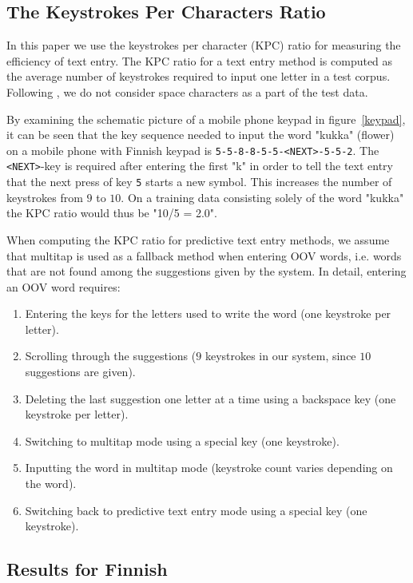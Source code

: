 \documentclass{llncs}
\begin{document}
\subsection{The Keystrokes Per Characters Ratio}

In this paper we use the keystrokes per character (KPC)
ratio for measuring the efficiency of text
entry. The KPC ratio for a text entry method is computed as the
average number of keystrokes required to input one letter in a test
corpus. Following \cite{Tantug:2010}, we do not consider space
characters as a part of the test data.

By examining the schematic picture of a mobile phone keypad in
figure~\ref{keypad}, it can be seen that the key sequence needed to
input the word "kukka" (flower) on a mobile phone with Finnish keypad
is {\tt 5-5-8-8-5-5-<NEXT>-5-5-2}. The {\tt <NEXT>}-key is required
after entering the first "k" in order to tell the text entry that the
next press of key {\tt 5} starts a new symbol. This increases the
number of keystrokes from $9$ to $10$. On a training data consisting
solely of the word "kukka" the KPC ratio would thus be "10/5 = 2.0".


When computing the KPC ratio for predictive text entry methods, we assume
that multitap is used as a fallback method when entering OOV words,
i.e. words that are not found among the suggestions given by the
system. In detail, entering an OOV word requires:
\begin{enumerate}
\item Entering the keys for the letters used to write the word (one
  keystroke per letter).
\item Scrolling through the suggestions ($9$ keystrokes in our system,
  since $10$ suggestions are given).
\item Deleting the last suggestion one letter at a time using a
  backspace key (one keystroke per letter).
\item Switching to multitap mode using a special key (one
  keystroke).
\item Inputting the word in multitap mode (keystroke count varies
  depending on the word).
\item Switching back to predictive text entry mode using a special key (one keystroke).
\end{enumerate}

\subsection{Results for Finnish}
\end{document}

